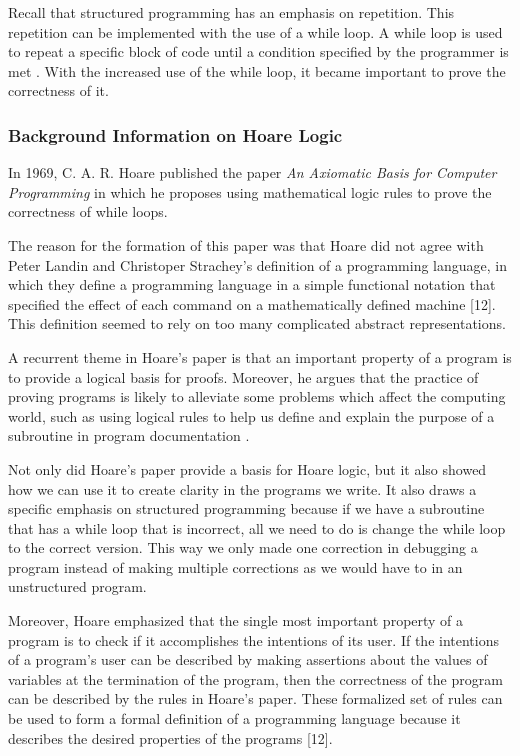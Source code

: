 \documentclass{article}
\begin{document}
\vspace{\baselineskip}

Recall that structured programming has an emphasis on repetition. This repetition can be implemented with the use of a while loop. A while loop is used to repeat a specific block of code until a condition specified by the programmer is met \cite{10}. With the increased use of the while loop, it became important to prove the correctness of it. 

\vspace{\baselineskip}
\subsubsection{Background Information on Hoare Logic}
In 1969, C. A. R. Hoare published the paper \textit{An Axiomatic Basis for Computer Programming} in which he proposes using mathematical logic rules to prove the correctness of while loops. 

\vspace{\baselineskip}
The reason for the formation of this paper was that Hoare did not agree with Peter Landin and Christoper Strachey's definition of a programming language, in which they define a programming language in a simple functional notation that specified the effect of each command on a mathematically defined machine [12]. This definition seemed to rely on too many complicated abstract representations.

\vspace{\baselineskip}
A recurrent theme in Hoare’s paper is that an important property of a program is to provide a logical basis for proofs. Moreover, he argues that the practice of proving programs is likely to alleviate some problems which affect the computing world, such as using logical rules to help us define and explain the purpose of a subroutine in program documentation \cite{11}.

\vspace{\baselineskip}
Not only did Hoare’s paper provide a basis for Hoare logic, but it also showed how we can use it to create clarity in the programs we write. It also draws a specific emphasis on structured programming because if we have a subroutine that has a while loop that is incorrect, all we need to do is change the while loop to the correct version. This way we only made one correction in debugging a program instead of making multiple corrections as we would have to in an unstructured program. 

\vspace{\baselineskip}
Moreover, Hoare emphasized that the single most important property of a program is to check if it accomplishes the intentions of its user. If the intentions of a program's user can be described by making assertions about the values of variables at the termination of the program, then the correctness of the program can be described by the rules in Hoare's paper. These formalized set of rules can be used to form a formal definition of a programming language because it describes the desired properties of the programs [12].
\end{document}
